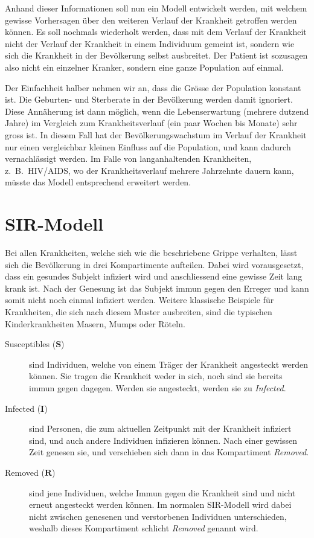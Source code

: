 \begin{refsection}
Anhand dieser Informationen soll nun ein Modell entwickelt werden, mit welchem gewisse Vorhersagen über den weiteren Verlauf der Krankheit getroffen werden können. 
Es soll nochmals wiederholt werden, dass mit dem Verlauf der Krankheit nicht der Verlauf der Krankheit in einem Individuum gemeint ist, sondern wie sich die Krankheit in der Bevölkerung selbst ausbreitet. 
Der Patient ist sozusagen also nicht ein einzelner Kranker, sondern eine ganze Population auf einmal.

Der Einfachheit halber nehmen wir an, dass die Grösse der Population konstant ist.
Die Geburten- und Sterberate in der Bevölkerung werden damit ignoriert.
Diese Annäherung ist dann möglich, wenn die Lebenserwartung (mehrere dutzend Jahre) im Vergleich zum Krankheitsverlauf (ein paar Wochen bis Monate) sehr gross ist.
In diesem Fall hat der Bevölkerungswachstum im Verlauf der Krankheit nur einen vergleichbar kleinen Einfluss auf die Population, und kann dadurch vernachläs\-sigt werden.
Im Falle von langanhaltenden Krankheiten, z.~B.~HIV/AIDS, wo der Krankheitsverlauf mehrere Jahrzehnte dauern kann, müsste das Modell entsprechend erweitert werden.

\section{SIR-Modell}
Bei allen Krankheiten, welche sich wie die beschriebene Grippe verhalten, lässt sich die Bevölkerung in drei Kompartimente aufteilen. Dabei wird vorausgesetzt, dass ein gesundes Subjekt infiziert wird und anschliessend eine gewisse Zeit lang krank ist. Nach der Genesung ist das Subjekt immun gegen den Erreger und kann somit nicht noch einmal infiziert werden. Weitere klassische Beispiele für Krankheiten, die sich nach diesem Muster ausbreiten, sind die typischen Kinderkrankheiten Masern, Mumps oder Röteln.
%
\begin{description}
  \item [Susceptibles ($\mathbf{S}$)] sind Individuen, welche von einem Träger der Krankheit angesteckt werden kön\-nen. Sie tragen die Krankheit weder in sich, noch sind sie bereits immun gegen dagegen. Werden sie angesteckt, werden sie zu \emph{Infected}.
%
  \item [Infected ($\mathbf{I}$)] sind Personen, die zum aktuellen Zeitpunkt mit der Krankheit infiziert sind, und auch andere Individuen infizieren können. Nach einer gewissen Zeit genesen sie, und verschieben sich dann in das Kompartiment \emph{Removed}.
%
  \item [Removed ($\mathbf{R}$)] sind jene Individuen, welche Immun gegen die Krankheit sind und nicht erneut angesteckt werden können. Im normalen SIR-Modell wird dabei nicht zwischen genesenen und verstorbenen Individuen unterschieden, weshalb dieses Kompartiment schlicht \emph{Removed} genannt wird.
%
\end{description}


\end{refsection}
